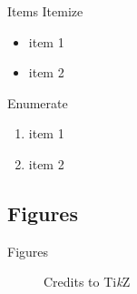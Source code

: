 \documentclass{article}
\begin{document}
\begin{frame}{Items}
  Itemize
  \begin{itemize}
    \item item 1
    \item item 2
  \end{itemize}

  \bigskip

  Enumerate
  \begin{enumerate}
    \item item 1
    \item item 2
  \end{enumerate}
\end{frame}

\subsection{Figures}

\begin{frame}{Figures}
  \begin{figure}
    \centering
    \caption{Credits to Ti\textit{k}Z}
  \end{figure}
\end{frame}
\end{document}
